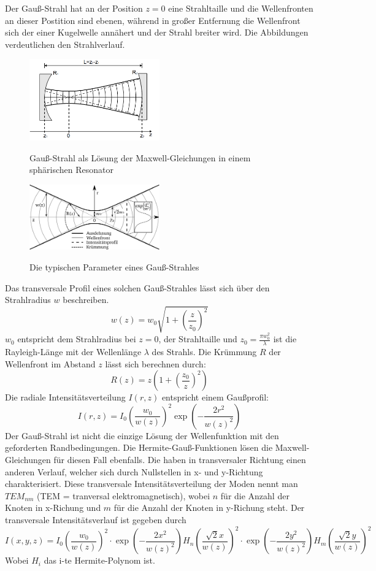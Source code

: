 \documentclass[bigchapter,colorback,accentcolor=tud4b,linedtoc,11pt]{tudreport}
\numberwithin{equation}{subsection}
\begin{document}
Der Gauß-Strahl hat an der Position \(z=0\) eine Strahltaille und die Wellenfronten an dieser Postition sind ebenen, während in großer Entfernung die Wellenfront sich der einer Kugelwelle annähert und der Strahl breiter wird. Die Abbildungen verdeutlichen den Strahlverlauf.

\begin{figure}[h]
	\centering
		\includegraphics[width=0.5\textwidth]{img/gauss_res.png}
	\caption{Gauß-Strahl als Lösung der Maxwell-Gleichungen in einem sphärischen Resonator}
  \cite{Resonatortheorie}
\end{figure}
\begin{figure}[h]
	\centering
		\includegraphics[width=0.5\textwidth]{img/gauss_param.png}
	\caption{Die typischen Parameter eines Gauß-Strahles}
  \cite{GSParamater}
\end{figure}
\FloatBarrier

Das transversale Profil eines solchen Gauß-Strahles lässt sich über den Strahlradius $w$ beschreiben.
$$w(z) = w_0 \sqrt{1+\left(\frac{z}{z_0}\right)^2}$$
$w_0$ entspricht dem Strahlradius bei $z=0$, der Strahltaille und $z_0 = \frac{\pi w_0^2}{\lambda}$ ist die Rayleigh-Länge mit der Wellenlänge $\lambda$ des Strahls.
Die Krümmung $R$ der Wellenfront im Abstand $z$ lässt sich berechnen durch:
$$R(z) = z \left(1+\left(\frac{z_0}{z}\right)^2\right)$$
Die radiale Intensitätsverteilung $I(r,z)$ entspricht einem Gaußprofil:
$$ I(r,z) = I_0 \left(\frac{w_0}{w(z)}\right)^2 \exp\left(-\frac{2r^2}{w(z)^2}\right)  $$
Der Gauß-Strahl ist nicht die einzige Lösung der Wellenfunktion mit den geforderten Randbedingungen. Die Hermite-Gauß-Funktionen lösen die Maxwell-Gleichungen für diesen Fall ebenfalls. Die haben in transversaler Richtung einen anderen Verlauf, welcher sich durch Nullstellen in x- und y-Richtung charakterisiert. Diese transversale Intensitätsverteilung der Moden nennt man $TEM_{nm}$ (TEM = tranversal elektromagnetisch), wobei $n$ für die Anzahl der Knoten in x-Richung und $m$ für die Anzahl der Knoten in y-Richung steht.
Der transversale Intensitätsverlauf ist gegeben durch
$$I(x,y, z) = I_0 \left(\frac{w_0}{w(z)}\right)^2 \cdot \exp\left(-\frac{2 x^2}{w(z)^2}\right) H_n\left(\frac{\sqrt{2}x}{w(z)}\right)^2 \cdot \exp\left(-\frac{2 y^2}{w(z)^2}\right) H_m\left(\frac{\sqrt{2}y}{w(z)}\right)^2$$
Wobei $H_i$ das i-te Hermite-Polynom ist.
\end{document}
